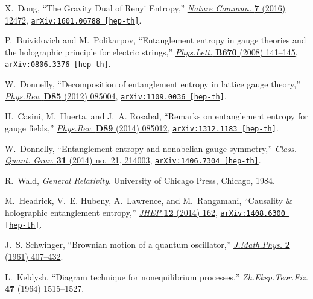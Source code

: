 \begin{thebibliography}{100}
X.~Dong, ``{The Gravity Dual of Renyi Entropy},''
  \href{http://dx.doi.org/10.1038/ncomms12472}{{\em Nature Commun.} {\bf 7}
  (2016)  12472},
\href{http://arxiv.org/abs/1601.06788}{{\tt arXiv:1601.06788 [hep-th]}}.

P.~Buividovich and M.~Polikarpov, ``{Entanglement entropy in gauge theories and
  the holographic principle for electric strings},''
  \href{http://dx.doi.org/10.1016/j.physletb.2008.10.032}{{\em Phys.Lett.} {\bf
  B670} (2008)  141--145},
\href{http://arxiv.org/abs/0806.3376}{{\tt arXiv:0806.3376 [hep-th]}}.

W.~Donnelly, ``{Decomposition of entanglement entropy in lattice gauge
  theory},'' \href{http://dx.doi.org/10.1103/PhysRevD.85.085004}{{\em
  Phys.Rev.} {\bf D85} (2012)  085004},
\href{http://arxiv.org/abs/1109.0036}{{\tt arXiv:1109.0036 [hep-th]}}.

H.~Casini, M.~Huerta, and J.~A. Rosabal, ``{Remarks on entanglement entropy for
  gauge fields},'' \href{http://dx.doi.org/10.1103/PhysRevD.89.085012}{{\em
  Phys.Rev.} {\bf D89} (2014)  085012},
\href{http://arxiv.org/abs/1312.1183}{{\tt arXiv:1312.1183 [hep-th]}}.

W.~Donnelly, ``{Entanglement entropy and nonabelian gauge symmetry},''
  \href{http://dx.doi.org/10.1088/0264-9381/31/21/214003}{{\em Class. Quant.
  Grav.} {\bf 31} (2014) no.~21, 214003},
\href{http://arxiv.org/abs/1406.7304}{{\tt arXiv:1406.7304 [hep-th]}}.

R.~Wald, {\em {General Relativity}}.
\newblock University of Chicago Press, Chicago, 1984.

M.~Headrick, V.~E. Hubeny, A.~Lawrence, and M.~Rangamani, ``{Causality \&
  holographic entanglement entropy},''
  \href{http://dx.doi.org/10.1007/JHEP12(2014)162}{{\em JHEP} {\bf 12} (2014)
  162},
\href{http://arxiv.org/abs/1408.6300}{{\tt arXiv:1408.6300 [hep-th]}}.

J.~S. Schwinger, ``{Brownian motion of a quantum oscillator},''
\href{http://dx.doi.org/10.1063/1.1703727}{{\em J.Math.Phys.} {\bf 2} (1961)
  407--432}.

L.~Keldysh, ``{Diagram technique for nonequilibrium processes},''
{\em Zh.Eksp.Teor.Fiz.} {\bf 47} (1964)  1515--1527.


\end{thebibliography}
